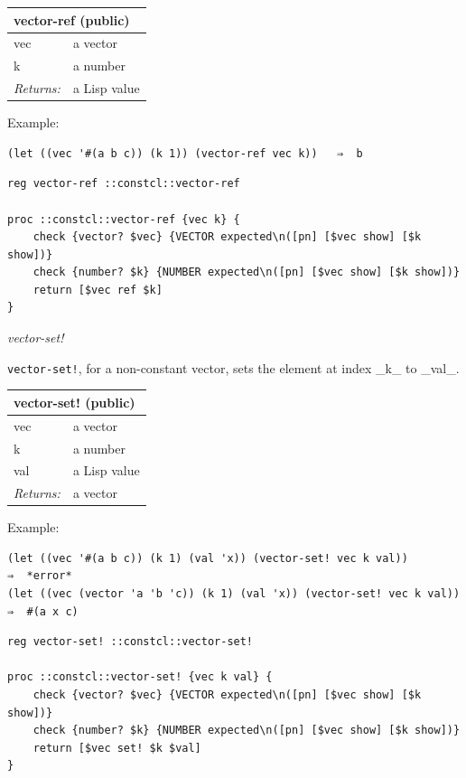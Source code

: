 \documentclass[twoside,9pt]{report}
\begin{document}
\begin{tabular}{ |l l| }
\hline
\multicolumn{2}{|l|}{vector-ref (public)} \\
\hline
vec & a vector \\
k & a number \\
\textit{Returns:} & a Lisp value \\
\hline
\end{tabular}


Example:

\noindent\makebox[\linewidth]{\rule{\linewidth}{0.4pt}}
\begin{lstlisting}
(let ((vec '#(a b c)) (k 1)) (vector-ref vec k))   ⇒  b
\end{lstlisting}
\noindent\makebox[\linewidth]{\rule{\linewidth}{0.4pt}}
\noindent\makebox[\linewidth]{\rule{\linewidth}{0.4pt}}
\begin{lstlisting}
reg vector-ref ::constcl::vector-ref
 
proc ::constcl::vector-ref {vec k} {
    check {vector? $vec} {VECTOR expected\n([pn] [$vec show] [$k show])}
    check {number? $k} {NUMBER expected\n([pn] [$vec show] [$k show])}
    return [$vec ref $k]
}
\end{lstlisting}
\noindent\makebox[\linewidth]{\rule{\linewidth}{0.4pt}}

\emph{vector-set!}


\texttt{vector-set!}, for a non-constant vector, sets the element at index \_k\_ to \_val\_.

\begin{tabular}{ |l l| }
\hline
\multicolumn{2}{|l|}{vector-set! (public)} \\
\hline
vec & a vector \\
k & a number \\
val & a Lisp value \\
\textit{Returns:} & a vector \\
\hline
\end{tabular}


Example:

\noindent\makebox[\linewidth]{\rule{\linewidth}{0.4pt}}
\begin{lstlisting}
(let ((vec '#(a b c)) (k 1) (val 'x)) (vector-set! vec k val))           ⇒  *error*
(let ((vec (vector 'a 'b 'c)) (k 1) (val 'x)) (vector-set! vec k val))   ⇒  #(a x c)
\end{lstlisting}
\noindent\makebox[\linewidth]{\rule{\linewidth}{0.4pt}}
\noindent\makebox[\linewidth]{\rule{\linewidth}{0.4pt}}
\begin{lstlisting}
reg vector-set! ::constcl::vector-set!
 
proc ::constcl::vector-set! {vec k val} {
    check {vector? $vec} {VECTOR expected\n([pn] [$vec show] [$k show])}
    check {number? $k} {NUMBER expected\n([pn] [$vec show] [$k show])}
    return [$vec set! $k $val]
}
\end{lstlisting}
\noindent\makebox[\linewidth]{\rule{\linewidth}{0.4pt}}
\end{document}
